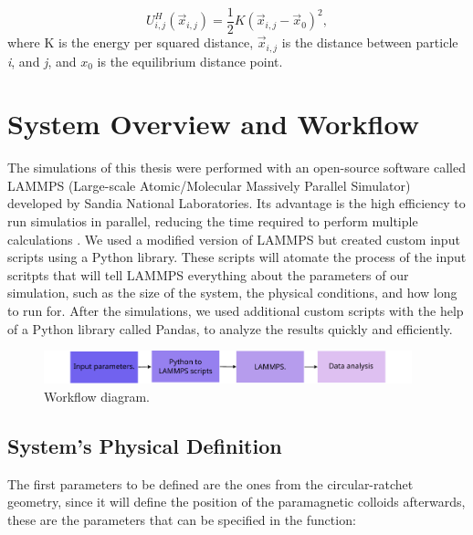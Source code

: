 \begin{equation}
  U^{H}_{i,j}(\vec{x}_{i,j}) = \frac{1}{2}K(\vec{x}_{i,j} - \vec{x}_0)^2,
\end{equation}
where K is the energy per squared distance, $\vec{x}_{i,j}$ is the distance between particle \textit{i}, and \textit{j}, and $x_0$ is the equilibrium distance point.

\section{System Overview and Workflow}

The simulations of this thesis were performed with an open-source software called LAMMPS (Large-scale Atomic/Molecular Massively Parallel Simulator) developed by Sandia National Laboratories. Its advantage is the high efficiency to run simulatios in parallel, reducing the time required to perform multiple calculations \cite{LAMMPS}. We used a modified version of LAMMPS but created custom input scripts using a Python library. These scripts will atomate the process of the input scritpts that will tell LAMMPS everything about the parameters of our simulation, such as the size of the system, the physical conditions, and how long to run for. After the simulations, we used additional custom scripts with the help of a Python library called Pandas, to analyze the results quickly and efficiently.

\begin{figure}[h]
  \begin{center}
    \includegraphics[width=0.95\textwidth]{figures/workflow.pdf}
  \end{center}
  \caption[Workflow diagram.]{Workflow diagram.}\label{fig:workflow}
\end{figure}

\subsection{System's Physical Definition}

The first parameters to be defined are the ones from the circular-ratchet geometry, since it will define the position of the paramagnetic colloids afterwards, these are the parameters that can be specified in the function:

